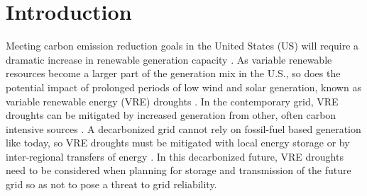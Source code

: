 \documentclass{agujournal2019}
\begin{document}

%
%
%
%


\section{Introduction}


Meeting carbon emission reduction goals in the United States (US) will require a dramatic increase in renewable generation capacity \cite{Browning_2023,Ou2023,Ou2024}. As variable renewable resources become a larger part of the generation mix in the U.S., so does the potential impact of prolonged periods of low wind and solar generation, known as variable renewable energy (VRE) droughts \cite{Bracken2024}. In the contemporary grid, VRE droughts can be mitigated by increased generation from other, often carbon intensive sources \cite{van_der_Wiel_2019a,Raynaud2018,Rife2016}. A decarbonized grid cannot rely on fossil-fuel based generation like today, so VRE droughts must be mitigated with local energy storage or by inter-regional transfers of energy \cite{Dyreson2022,Doering2023}. In this decarbonized future, VRE droughts need to be considered when planning for storage and transmission of the future grid so as not to pose a threat to grid reliability. 
\end{document}
